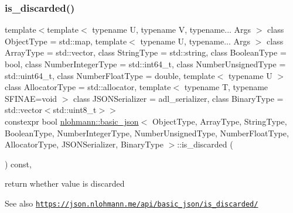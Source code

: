\subsubsection{\texorpdfstring{is\+\_\+discarded()}{is\_discarded()}}
{\footnotesize\ttfamily template$<$template$<$ typename U, typename V, typename... Args $>$ class Object\+Type = std\+::map, template$<$ typename U, typename... Args $>$ class Array\+Type = std\+::vector, class String\+Type  = std\+::string, class Boolean\+Type  = bool, class Number\+Integer\+Type  = std\+::int64\+\_\+t, class Number\+Unsigned\+Type  = std\+::uint64\+\_\+t, class Number\+Float\+Type  = double, template$<$ typename U $>$ class Allocator\+Type = std\+::allocator, template$<$ typename T, typename S\+F\+I\+N\+A\+E=void $>$ class J\+S\+O\+N\+Serializer = adl\+\_\+serializer, class Binary\+Type  = std\+::vector$<$std\+::uint8\+\_\+t$>$$>$ \\
constexpr bool \hyperlink{classnlohmann_1_1basic__json}{nlohmann\+::basic\+\_\+json}$<$ Object\+Type, Array\+Type, String\+Type, Boolean\+Type, Number\+Integer\+Type, Number\+Unsigned\+Type, Number\+Float\+Type, Allocator\+Type, J\+S\+O\+N\+Serializer, Binary\+Type $>$\+::is\+\_\+discarded (\begin{DoxyParamCaption}{ }\end{DoxyParamCaption}) const\hspace{0.3cm}{\ttfamily [inline]}, {\ttfamily [noexcept]}}



return whether value is discarded 

\begin{DoxySeeAlso}{See also}
\href{https://json.nlohmann.me/api/basic_json/is_discarded/}{\tt https\+://json.\+nlohmann.\+me/api/basic\+\_\+json/is\+\_\+discarded/} 
\end{DoxySeeAlso}
\mbox{\label{classnlohmann_1_1basic__json_aedc7afad96292b5ab61a2e0ad3067f5f}} 
